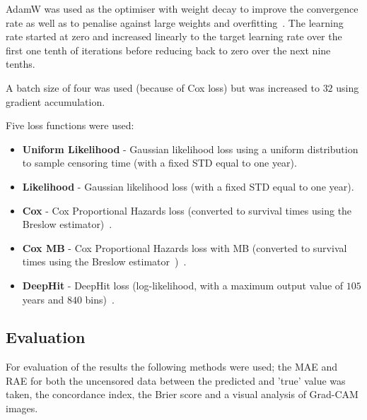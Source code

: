         AdamW was used as the optimiser with weight decay to improve the convergence rate as well as to penalise against large weights and overfitting~\cite{Loshchilov2019DecoupledRegularization}. The learning rate started at zero and increased linearly to the target learning rate over the first one tenth of iterations before reducing back to zero over the next nine tenths.

        A batch size of four was used (because of Cox loss) but was increased to $32$ using gradient accumulation.

        Five loss functions were used:

        \begin{itemize}
            \item \textbf{Uniform Likelihood} - Gaussian likelihood loss using a uniform distribution to sample censoring time (with a fixed \gls{STD} equal to one year).

            \item \textbf{Likelihood} - Gaussian likelihood loss (with a fixed \gls{STD} equal to one year).

            \item \textbf{Cox} - Cox Proportional Hazards loss (converted to survival times using the Breslow estimator)~\cite{Cox1972RegressionLife-Tables}.

            \item \textbf{Cox \gls{MB}} - Cox Proportional Hazards loss with \gls{MB} (converted to survival times using the Breslow estimator~\cite{Breslow1974CovarianceData})~\cite{Shahin2022SurvivalData}.

            \item \textbf{DeepHit} - DeepHit loss (log-likelihood, with a maximum output value of $105$ years and $840$ bins)~\cite{Lee2018DeepHit:Risks}.
        \end{itemize}

    \subsection{Evaluation} \label{sec:evaluation}
        For evaluation of the results the following methods were used; the \gls{MAE} and \gls{RAE} for both the uncensored data between the predicted and 'true' value was taken, the concordance index, the Brier score and a visual analysis of Grad-CAM images.
